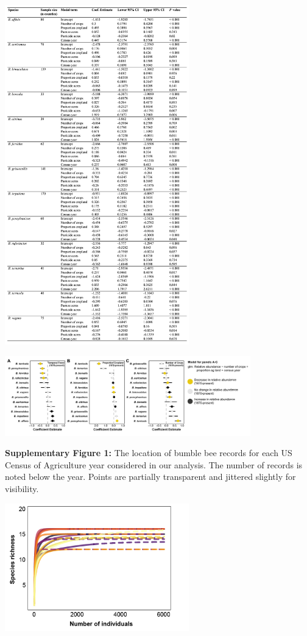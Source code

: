 \documentclass[11pt,]{article}
\begin{document}
\includegraphics[width=0.6\textwidth,height=\textheight]{../ms_figs/tables2.png}

\clearpage

\newpage

\includegraphics[width=0.8\textwidth,height=\textheight]{../ms_figs/fig_s2.png}

\textbf{Supplementary Figure 1:} The location of bumble bee records for
each US Census of Agriculture year considered in our analysis. The
number of records is noted below the year. Points are partially
transparent and jittered slightly for visibility.

\clearpage

\newpage

\includegraphics[width=0.6\textwidth,height=\textheight]{../ms_figs/fig_s3.png}
\end{document}
